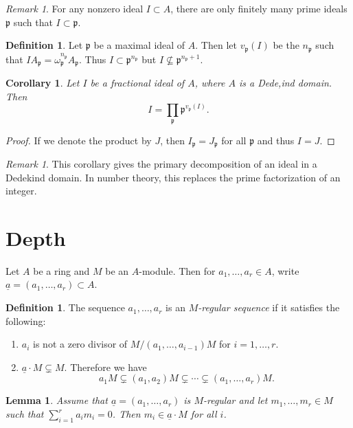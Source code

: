 \documentclass[leqno, openany]{memoir}
\newtheorem{cor}[thm]{Corollary}
\newtheorem{lem}[thm]{Lemma}
\theoremstyle{definition}
\newtheorem{defn}[thm]{Definition}
\theoremstyle{remark}
\newtheorem{rmk}[thm]{Remark}
\theoremstyle{plain}
\theoremstyle{definition}
\theoremstyle{remark}
\newcommand{\mf}[1]{\mathfrak{#1}}
\newcommand{\ul}[1]{\underline{#1}}
\begin{document}
\begin{rmk} For any nonzero ideal $I \subset A$, there are only finitely many
prime ideals $\mf{p}$ such that $I \subset \mf{p}$.  \end{rmk}

\begin{defn} Let $\mf{p}$ be a maximal ideal of $A$. Then let $v_{\mf{p}}(I)$
    be the $n_{\mf{p}}$ such that $I A_{\mf{p}} = \omega_{\mf{p}}^{n_{\mf{p}}}
    A_{\mf{p}}$. Thus $I \subset \mf{p}^{n_{\mf{p}}}$ but $I \not \subseteq
    \mf{p}^{n_{\mf{p}} + 1}$.  \end{defn}

\begin{cor} Let $I$ be a fractional ideal of $A$, where $A$ is a Dede,ind
    domain. Then \[ I = \prod_{\mf{p}} \mf{p}^{v_{\mf{p}}(I)}. \] \end{cor}

\begin{proof} If we denote the product by $J$, then $I_{\mf{p}} = J_{\mf{p}}$
for all $\mf{p}$ and thus $I = J$.  \end{proof}

\begin{rmk} This corollary gives the primary decomposition of an ideal in a
Dedekind domain. In number theory, this replaces the prime factorization of an
integer.  \end{rmk}

\section{Depth}%

Let $A$ be a ring and $M$ be an $A$-module. Then for $a_1, \ldots, a_r \in A$,
write $\ul{a} = (a_1, \ldots, a_r) \subset A$. 

\begin{defn} The sequence $a_1, \ldots, a_r$ is an \textit{$M$-regular
    sequence} if it satisfies the following: \begin{enumerate} \item $a_i$ is
        not a zero divisor of $M / (a_1, \ldots, a_{i-1})M$ for $i = 1, \ldots,
        r$.  \item $\ul{a} \cdot M \subsetneq M$. Therefore we have \[ a_1 M
    \subsetneq (a_1,a_2) M \subsetneq \cdots \subsetneq (a_1, \ldots, a_r) M.
    \] \end{enumerate} \end{defn}

\begin{lem} Assume that $\ul{a} = (a_1, \ldots, a_r)$ is $M$-regular and let
$m_1, \ldots, m_r \in M$ such that $\sum_{i=1}^r a_i m_i = 0$. Then $m_i \in
\ul{a} \cdot M$ for all $i$.  \end{lem}
\end{document}
